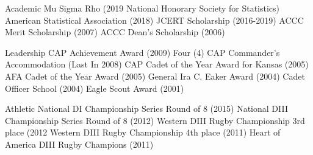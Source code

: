 
Academic
Mu Sigma Rho (2019 National Honorary Society for Statistics)
American Statistical Association (2018)
JCERT Scholarship (2016-2019)
ACCC Merit Scholarship (2007)
ACCC Dean’s Scholarship (2006)

\vspace*{0.01 in}

Leadership
CAP Achievement Award (2009)
Four (4) CAP Commander’s Accommodation (Last In 2008)
CAP Cadet of the Year Award for Kansas (2005)
AFA Cadet of the Year Award (2005)
General Ira C. Eaker Award (2004)
Cadet Officer School (2004)
Eagle Scout Award (2001)

\vspace*{0.01 in}

Athletic
National DI Championship Series Round of 8 (2015)
National DIII Championship Series Round of 8 (2012)
Western DIII Rugby Championship 3rd place (2012
Western DIII Rugby Championship 4th place (2011)
Heart of America DIII Rugby Champions (2011)
